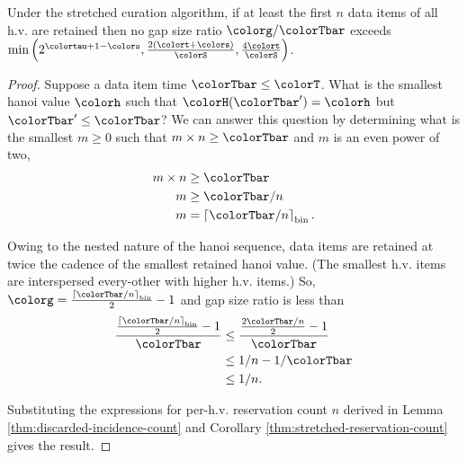\begin{theorem}
\label{thm:stretched-gap-size}
Under the stretched curation algorithm, if at least the first $n$ data items of all h.v. are retained then no gap size ratio $\colorg/\colorTbar$ exceeds $\min\Big(
  2^{\colortau+1-\colors}
  ,
  \frac{2(\colort + \colors)}{\colorS},
  \frac{4\colort}{\colorS}
\Big)$.
\end{theorem}
\begin{proof}

Suppose a data item time $\colorTbar \leq \colorT$.
What is the smallest hanoi value $\colorh$ such that $\colorH(\colorTbar') = \colorh$ but $\colorTbar' \leq \colorTbar$?
We can answer this question by determining what is the smallest $m \geq 0$ such that $m \times n \geq \colorTbar$ and $m$ is an even power of two,
\begin{align*}
m \times n
&\geq \colorTbar\\
m
&\geq \colorTbar / n\\
m
&= \left\lceil \colorTbar / n \right\rceil_{\mathrm{bin}}.
\end{align*}

Owing to the nested nature of the hanoi sequence, data items are retained at twice the cadence of the smallest retained hanoi value.
(The smallest h.v. items are interspersed every-other with higher h.v. items.)
So, $\colorg = \frac{\left\lceil \colorTbar / n \right\rceil_{\mathrm{bin}}}{2} - 1$ and gap size ratio is less than
\begin{align*}
\frac{
\frac{\left\lceil \colorTbar / n \right\rceil_{\mathrm{bin}}}{2} - 1
}{
\colorTbar
}
&\leq
\frac{
\frac{2\colorTbar / n}{2} - 1
}{
\colorTbar
}\\
&\leq
1 / n - 1 / \colorTbar\\
&\leq
1 / n.
\end{align*}

Substituting the expressions for per-h.v. reservation count $n$ derived in Lemma \ref{thm:discarded-incidence-count} and Corollary \ref{thm:stretched-reservation-count} gives the result.
\end{proof}
